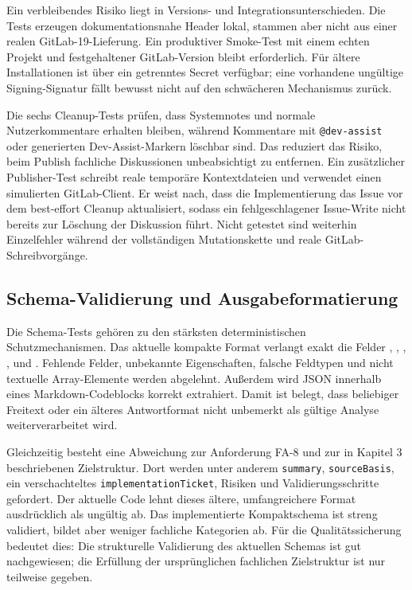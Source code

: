 Ein verbleibendes Risiko liegt in Versions- und Integrationsunterschieden. Die Tests erzeugen dokumentationsnahe Header lokal, stammen aber nicht aus einer realen GitLab-19-Lieferung. Ein produktiver Smoke-Test mit einem echten Projekt und festgehaltener GitLab-Version bleibt erforderlich. Für ältere Installationen ist  über ein getrenntes Secret verfügbar; eine vorhandene ungültige Signing-Signatur fällt bewusst nicht auf den schwächeren Mechanismus zurück.

Die sechs Cleanup-Tests prüfen, dass Systemnotes und normale Nutzerkommentare erhalten bleiben, während Kommentare mit \texttt{@dev-assist} oder generierten Dev-Assist-Markern löschbar sind. Das reduziert das Risiko, beim Publish fachliche Diskussionen unbeabsichtigt zu entfernen. Ein zusätzlicher Publisher-Test schreibt reale temporäre Kontextdateien und verwendet einen simulierten GitLab-Client. Er weist nach, dass die Implementierung das Issue vor dem best-effort Cleanup aktualisiert, sodass ein fehlgeschlagener Issue-Write nicht bereits zur Löschung der Diskussion führt. Nicht getestet sind weiterhin Einzelfehler während der vollständigen Mutationskette und reale GitLab-Schreibvorgänge.

\subsection{Schema-Validierung und Ausgabeformatierung}

Die Schema-Tests gehören zu den stärksten deterministischen Schutzmechanismen. Das aktuelle kompakte Format verlangt exakt die Felder , , , ,  und . Fehlende Felder, unbekannte Eigenschaften, falsche Feldtypen und nicht textuelle Array-Elemente werden abgelehnt. Außerdem wird JSON innerhalb eines Markdown-Codeblocks korrekt extrahiert. Damit ist belegt, dass beliebiger Freitext oder ein älteres Antwortformat nicht unbemerkt als gültige Analyse weiterverarbeitet wird.

Gleichzeitig besteht eine Abweichung zur Anforderung FA-8 und zur in Kapitel 3 beschriebenen Zielstruktur. Dort werden unter anderem \texttt{summary}, \texttt{sourceBasis}, ein verschachteltes \texttt{implementationTicket}, Risiken und Validierungsschritte gefordert. Der aktuelle Code lehnt dieses ältere, umfangreichere Format ausdrücklich als ungültig ab. Das implementierte Kompaktschema ist streng validiert, bildet aber weniger fachliche Kategorien ab. Für die Qualitätssicherung bedeutet dies: Die strukturelle Validierung des aktuellen Schemas ist gut nachgewiesen; die Erfüllung der ursprünglichen fachlichen Zielstruktur ist nur teilweise gegeben.

